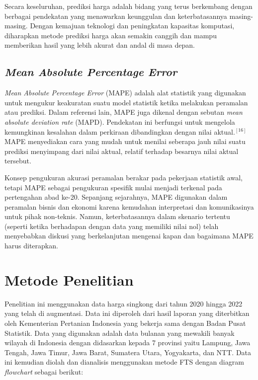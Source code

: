 \documentclass[conference]{IEEEtran}
\begin{document}
Secara keseluruhan, prediksi harga adalah bidang yang terus berkembang dengan berbagai pendekatan yang menawarkan keunggulan dan keterbatasannya masing-masing. Dengan kemajuan teknologi dan peningkatan kapasitas komputasi, diharapkan metode prediksi harga akan semakin canggih dan mampu memberikan hasil yang lebih akurat dan andal di masa depan.

\subsection{\textit{Mean Absolute Percentage Error}}
\textit{Mean Absolute Percentage Error} (MAPE) adalah alat statistik yang digunakan untuk mengukur keakuratan suatu model statistik ketika melakukan peramalan atau prediksi. Dalam referensi lain, MAPE juga dikenal dengan sebutan \textit{mean absolute deviation rate} (MAPD). Pendekatan ini berfungsi untuk mengelola kemungkinan kesalahan dalam perkiraan dibandingkan dengan nilai aktual.$^{[16]}$ MAPE menyediakan cara yang mudah untuk menilai seberapa jauh nilai suatu prediksi menyimpang dari nilai aktual, relatif terhadap besarnya nilai aktual tersebut.

Konsep pengukuran akurasi peramalan berakar pada pekerjaan statistik awal, tetapi MAPE sebagai pengukuran spesifik mulai menjadi terkenal pada pertengahan abad ke-20. Sepanjang sejarahnya, MAPE digunakan dalam peramalan bisnis dan ekonomi karena kemudahan interpretasi dan komunikasinya untuk pihak non-teknis. Namun, keterbatasannya dalam skenario tertentu (seperti ketika berhadapan dengan data yang memiliki nilai nol) telah menyebabkan diskusi yang berkelanjutan mengenai kapan dan bagaimana MAPE harus diterapkan.



\section{Metode Penelitian}

Penelitian ini menggunakan data harga singkong dari tahun 2020 hingga 2022 yang telah di augmentasi. Data ini diperoleh dari hasil laporan yang diterbitkan oleh Kementerian Pertanian Indonesia yang bekerja sama dengan Badan Pusat Statistik. Data yang digunakan adalah data bulanan yang mewakili banyak wilayah di Indonesia dengan didasarkan kepada 7 provinsi yaitu Lampung, Jawa Tengah, Jawa Timur, Jawa Barat, Sumatera Utara, Yogyakarta, dan NTT. Data ini kemudian diolah dan dianalisis menggunakan metode FTS dengan diagram \textit{flowchart} sebagai berikut:
\end{document}

